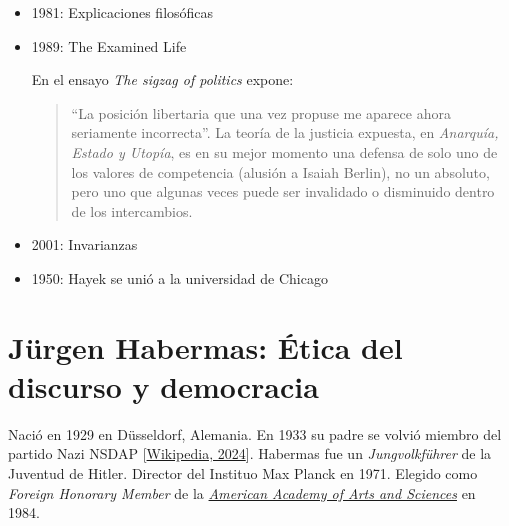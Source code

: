 \documentclass[
  letterpaper,
  DIV=11,
  numbers=noendperiod]{scrreprt}
\begin{document}
\begin{itemize}
  Utopía

  El mejor de los mundos posibles es el que permite que la mayor
  cantidad de gente posible viva lo más cerca posible de como desea
  vivir.

  \begin{itemize}
  \item
    Defensa de Nozick al ``Estado mínimo'':

    La visión libertaria puede crear un espacio para todos los estilos
    de vida, incluidos los anti-libertarios: las comunidades
    particulares podrían tener restricciones internas.

    ``No veo muy claro mi camino a través de estas cuestiones'' Nozick,
    The Examined Life pp 287-288.
  \end{itemize}
\item
  1981: Explicaciones filosóficas
\item
  1989: The Examined Life

  En el ensayo \emph{The sigzag of politics} expone:

  \begin{quote}
  ``La posición libertaria que una vez propuse me aparece ahora
  seriamente incorrecta''. La teoría de la justicia expuesta, en
  \emph{Anarquía, Estado y Utopía}, es en su mejor momento una defensa
  de solo uno de los valores de competencia (alusión a Isaiah Berlin),
  no un absoluto, pero uno que algunas veces puede ser invalidado o
  disminuido dentro de los intercambios.
  \end{quote}
\item
  2001: Invarianzas
\item
  1950: Hayek se unió a la universidad de Chicago
\end{itemize}

\section{Jürgen Habermas: Ética del discurso y
democracia}\label{juxfcrgen-habermas-uxe9tica-del-discurso-y-democracia}

Nació en 1929 en Düsseldorf, Alemania. En 1933 su padre se volvió
miembro del partido Nazi NSDAP
{[}\href{https://en.wikipedia.org/wiki/J\%C3\%BCrgen_Habermas}{Wikipedia,
2024}{]}. Habermas fue un \emph{Jungvolkführer} de la Juventud de
Hitler. Director del Instituo Max Planck en 1971. Elegido como
\emph{Foreign Honorary Member} de la \hyperref[0]{\emph{American Academy
of Arts and Sciences}} en 1984.
\end{document}
